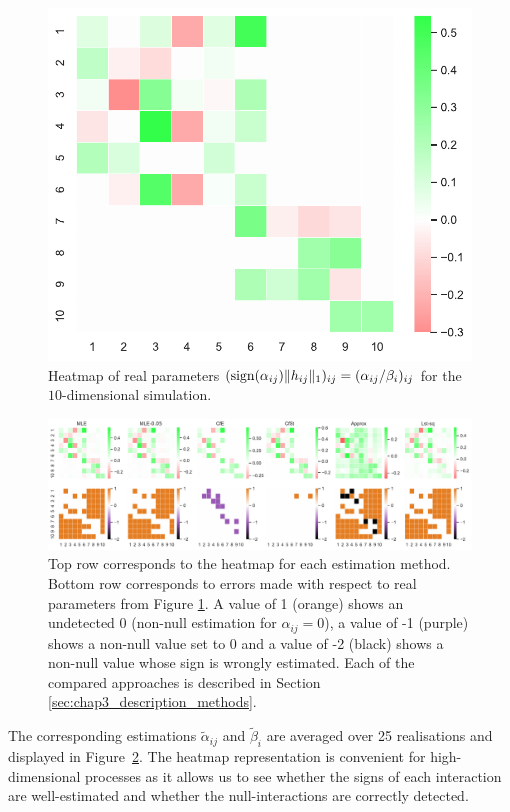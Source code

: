     {\begin{figure}
    \centering
    \includegraphics[clip,width=0.75\linewidth]{images/chapter3/Realheat.pdf}
    \caption{Heatmap of real parameters $(\operatorname{sign}(\alpha_{ij})\|h_{ij}\|_1)_{ij} = (\alpha_{ij}/\beta_i)_{ij}$ for the $10$-dimensional simulation.}
    \label{fig:chap3_heatmap_10}
    \end{figure}}
    {\begin{figure}
    \centering
    \includegraphics[clip, width=\linewidth]{images/chapter3/heatmap_hori.pdf}
    \caption{Top row corresponds to the heatmap for each estimation method. Bottom row corresponds to errors made with respect to real parameters from Figure \ref{fig:chap3_heatmap_10}. A value of 1 (orange) shows an undetected 0 (non-null estimation for $\alpha_{ij} = 0$), a value of -1 (purple) shows a non-null value set to 0 and a value of -2 (black) shows a non-null value whose sign is wrongly estimated. Each of the compared approaches is described in Section \ref{sec:chap3_description_methods}.}
    \label{fig:chap3_heatmap_estimated}
    \end{figure}}

    The corresponding estimations \(\tilde \alpha_{ij}\) and \(\tilde \beta_{i}\) are averaged over 25 realisations and displayed in Figure~\ref{fig:chap3_heatmap_estimated}.
    The heatmap representation is convenient for high-dimensional processes as it allows us to see whether the signs of each interaction are well-estimated and whether the null-interactions are correctly detected.



